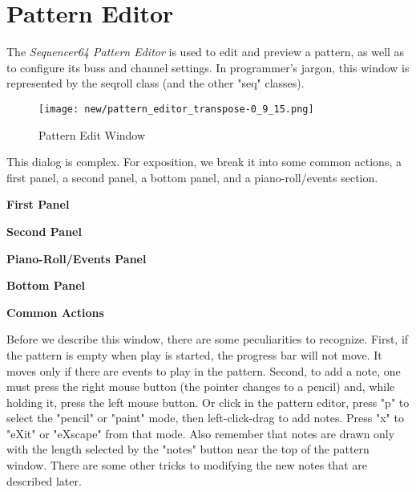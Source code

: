 %
%

\section{Pattern Editor}
\label{sec:seq64_pattern_editor}

   The \textsl{Sequencer64 Pattern Editor} is used to edit and preview a
   pattern, as well as to configure its buss and channel settings.
   In programmer's jargon, this window is represented by the seqroll class (and
   the other "seq" classes).

\begin{figure}[H]
   \centering 
   \texttt{[image: new/pattern\_editor\_transpose-0\_9\_15.png]}
   \caption{Pattern Edit Window}
   \label{fig:pattern_edit_window}
\end{figure}

   This dialog is complex.
   For exposition, we break it into some common actions, a first panel, a
   second panel, a bottom panel, and a piano-roll/events section.

   \begin{enumber}
      \item \textbf{First Panel}
      \item \textbf{Second Panel}
      \item \textbf{Piano-Roll/Events Panel}
      \item \textbf{Bottom Panel}
      \item \textbf{Common Actions}
   \end{enumber}

   Before we describe this window, there are some peculiarities to recognize.
   First, if the pattern is empty when play is started, the progress bar will
   not move.  It moves only if there are events to play in the pattern.
   Second, to add a note, one must press the right mouse button (the pointer
   changes to a pencil) and, while holding it, press the left mouse button.  Or
   click in the pattern editor, press
   "p" to select the "pencil" or "paint" mode, then
   left-click-drag to add notes.
   Press "x" to "eXit" or "eXscape" from that mode.  Also remember
   that notes are drawn only with the length selected by the "notes" button
   near the top of the pattern window.  There are some other tricks to
   modifying the new notes that are described later.

